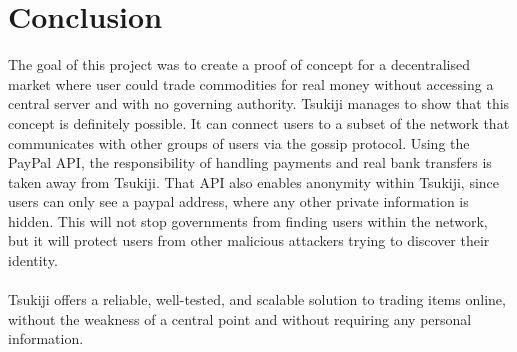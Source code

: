 \section{Conclusion}
The goal of this project was to create a proof of concept for a decentralised market where user could trade commodities for real money without accessing a central server and with no governing authority.
Tsukiji manages to show that this concept is definitely possible. It can connect users to a subset of the network that communicates with other groups of users via the gossip protocol.
Using the PayPal API, the responsibility of handling payments and real bank transfers is taken away from Tsukiji.
That API also enables anonymity within Tsukiji, since users can only see a paypal address, where any other private information is hidden.
This will not stop governments from finding users within the network, but it will protect users from other malicious attackers trying to discover their identity.\\
\\
Tsukiji offers a reliable, well-tested, and scalable solution to trading items online, without the weakness of a central point and without requiring any personal information.